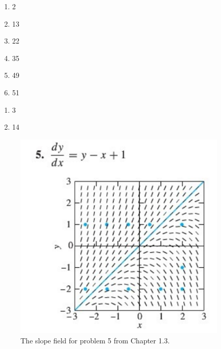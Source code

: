 \documentclass[11pt]{article}
\begin{document}
\begin{enumerate}
\setlength{\itemsep}{-1mm}
  \item 2
  \item 13
  \item 22
  \item 35
  \item 49
  \item 51
    
\end{enumerate}

\begin{enumerate}
\setlength{\itemsep}{-1mm}
  \item 3
  \item 14
\end{enumerate}


\begin{figure}[h]
\vspace{-8mm}
\begin{center}
\includegraphics[width=4in]{slopefield_1.png}
\vspace{-2mm}
\caption{The slope field for problem 5 from Chapter 1.3.}
\vspace{-5mm}
\end{center}
\end{figure}
\end{document}
